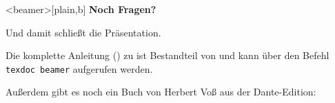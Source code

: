 \begin{lfgwcode}{}

\begin{frame}<beamer>[plain,b] %
  \huge\bfseries\color{structure!15} Noch Fragen?
  \vspace{0.3cm} %
\end{frame}

\end{lfgwcode}

Und damit schließt die Präsentation.

\begin{lfgwcode}{}

\end{lfgwcode}

Die komplette Anleitung (\cite{tantau:beamer}) zu  ist Bestandteil von \TeXLive{} und kann
über den Befehl \texttt{texdoc beamer} aufgerufen werden.

Außerdem gibt es noch ein Buch von Herbert Voß aus der Dante-Edition: \cite{voss:praesentationen}


